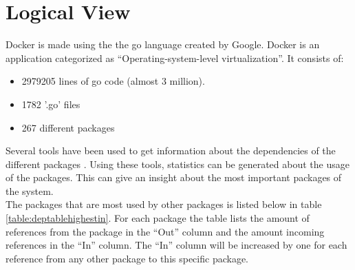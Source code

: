 
\section{Logical View}
\label{sec:viewlogical}


Docker is made using the the go language created by Google. Docker is an application categorized as ``Operating-system-level virtualization''. It consists of:
\begin{itemize}
\item 2979205 lines of go code (almost 3 million).
\item 1782 '.go' files
\item 267 different packages
\end{itemize}

Several tools have been used to get information about the dependencies of the different packages \cite{goviz} \cite{godepgraph}. Using these tools, statistics can be generated about the usage of the packages. This can give an insight about the most important packages of the system.\\ 
The packages that are most used by other packages is listed below in table \ref{table:deptablehighestin}. For each package the table lists the amount of references from the package in the ``Out'' column and the amount incoming references in the ``In'' column. The ``In'' column will be increased by one for each reference from any other package to this specific package.

